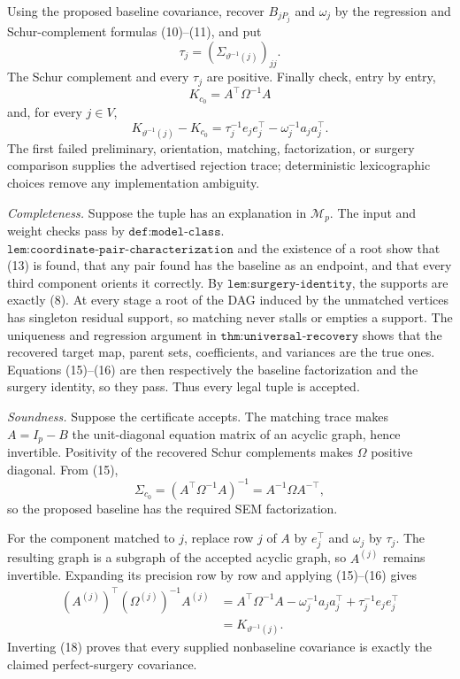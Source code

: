 Using the proposed baseline covariance, recover \(B_{jP_j}\) and
\(\omega_j\) by the regression and Schur-complement formulas (10)--(11),
and put
\[
 \tau_j=(\Sigma_{\vartheta^{-1}(j)})_{jj}.
\]
The Schur complement and every \(\tau_j\) are positive.  Finally check,
entry by entry,
\[
 K_{c_0}=A^{\top}\Omega^{-1}A                                    \tag{15}
\]
and, for every \(j\in V\),
\[
 K_{\vartheta^{-1}(j)}-K_{c_0}
 =\tau_j^{-1}e_je_j^{\top}-\omega_j^{-1}a_ja_j^{\top}.              \tag{16}
\]
The first failed preliminary, orientation, matching, factorization, or
surgery comparison supplies the advertised rejection trace; deterministic
lexicographic choices remove any implementation ambiguity.

\emph{Completeness.}
Suppose the tuple has an explanation in \(\mathcal M_p\).  The input and
weight checks pass by \(\texttt{def:model-class}\).
\(\texttt{lem:coordinate-pair-characterization}\) and the existence of a
root show that (13) is found, that any pair found has the baseline as an
endpoint, and that every third component orients it correctly.  By
\(\texttt{lem:surgery-identity}\), the supports are exactly (8).
At every stage a root of the DAG induced by the unmatched vertices has
singleton residual support, so matching never stalls or empties a support.
The uniqueness and regression argument in
\(\texttt{thm:universal-recovery}\) shows that the recovered target map,
parent sets, coefficients, and variances are the true ones.  Equations
(15)--(16) are then respectively the baseline factorization and the
surgery identity, so they pass.  Thus every legal tuple is accepted.

\emph{Soundness.}
Suppose the certificate accepts.  The matching trace makes
\(A=I_p-B\) the unit-diagonal equation matrix of an acyclic graph, hence
invertible.  Positivity of the recovered Schur complements makes
\(\Omega\) positive diagonal.  From (15),
\[
 \Sigma_{c_0}
 =(A^{\top}\Omega^{-1}A)^{-1}
 =A^{-1}\Omega A^{-\top},                                        \tag{17}
\]
so the proposed baseline has the required SEM factorization.

For the component matched to \(j\), replace row \(j\) of \(A\) by
\(e_j^{\top}\) and \(\omega_j\) by \(\tau_j\).  The resulting graph is a
subgraph of the accepted acyclic graph, so \(A^{(j)}\) remains invertible.
Expanding its precision row by row and applying (15)--(16) gives
\[
 \begin{aligned}
 (A^{(j)})^{\top}(\Omega^{(j)})^{-1}A^{(j)}
 &=A^{\top}\Omega^{-1}A
   -\omega_j^{-1}a_ja_j^{\top}
   +\tau_j^{-1}e_je_j^{\top}\\
 &=K_{\vartheta^{-1}(j)} .
 \end{aligned}                                                     \tag{18}
\]
Inverting (18) proves that every supplied nonbaseline covariance is
exactly the claimed perfect-surgery covariance.

